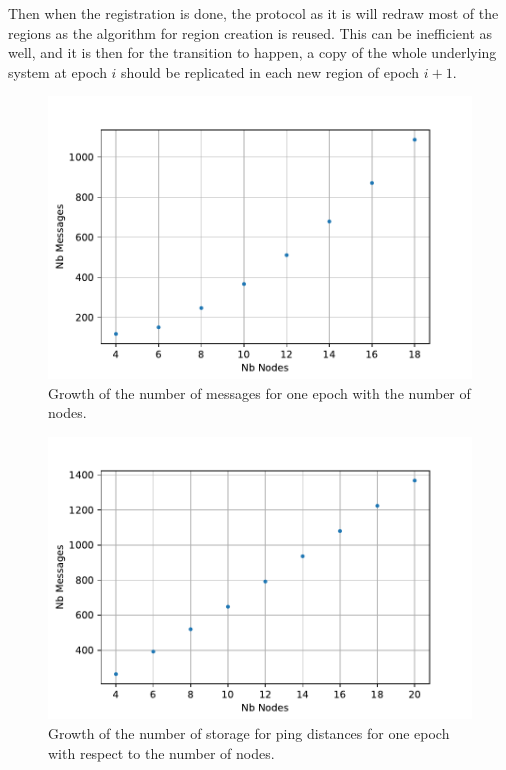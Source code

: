 \documentclass[a4paper,11pt,oneside]{report}
\begin{document}
Then when the registration is done, the protocol as it is will redraw most of
the regions as the algorithm for region creation is reused. This can be
inefficient as well, and it is then for the transition to happen, a copy of the
whole underlying system at epoch $i$ should be replicated in each new region of
epoch $i+1$.


\begin{figure}[!h] 
\centering
\includegraphics[width=350pt]{figures/messages-plot}
\caption{Growth of the number of messages for one epoch with the number of nodes.}
\label{fig:messages-plot}
\end{figure}


\begin{figure}[!h] 
\centering
\includegraphics[width=350pt]{figures/storage-plot}
\caption{Growth of the number of storage for ping distances for one epoch with respect to the number of nodes.}
\label{fig:storage-plot}
\end{figure}
\end{document}
